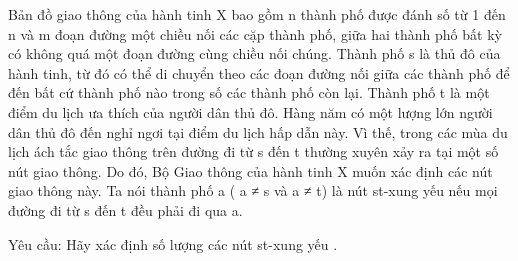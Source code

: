 Bản đồ giao thông của hành tinh X bao gồm n thành phố được đánh số từ 1 đến n và m đoạn đường một chiều nối các cặp thành phố, giữa hai thành phố bất kỳ có không quá một đoạn đường cùng chiều nối chúng. Thành phố s là thủ đô của hành tinh, từ đó có thể di chuyển theo các đoạn đường nối giữa các thành phố để đến bất cứ thành phố nào trong số các thành phố còn lại. Thành phố t là một điểm du lịch ưa thích của người dân thủ đô. Hàng năm có một lượng lớn người dân thủ đô đến nghỉ ngơi tại điểm du lịch hấp dẫn này. Vì thế, trong các mùa du lịch ách tắc giao thông trên đường đi từ s đến t thường xuyên xảy ra tại một số nút giao thông. Do đó, Bộ Giao thông của hành tinh X muốn xác định các nút giao thông này. Ta nói thành phố a ( a ≠ s và a ≠ t) là nút st-xung yếu nếu mọi đường đi từ s đến t đều phải đi qua a.





Yêu cầu: Hãy xác định số lượng các nút st-xung yếu .